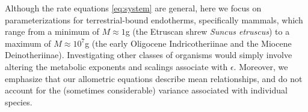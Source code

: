\documentclass{pnastwo}
\begin{document}
\begin{article}
Although the rate equations \eqref{eq:system} are general, here we focus on parameterizations for terrestrial-bound endotherms, specifically mammals, which range from a minimum of $M\approx1$g (the Etruscan shrew \emph{Suncus etruscus}) to a maximum of $M\approx10^7$g (the early Oligocene Indricotheriinae and the Miocene Deinotheriinae).
Investigating other classes of organisms would simply involve altering the metabolic exponents and scalings associate with $\epsilon$. Moreover, we emphasize that our allometric equations describe mean relationships, and do not account for the (sometimes considerable) variance associated with individual species.\\






\end{article}
\end{document}
